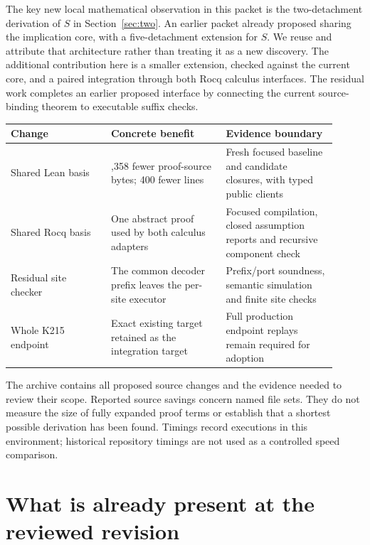 \documentclass[11pt,letterpaper]{article}
\begin{document}
The key new local mathematical observation in this packet is the two-detachment
derivation of $S$ in Section~\ref{sec:two}. An earlier packet already proposed
sharing the implication core, with a five-detachment extension for $S$.
We reuse and attribute that architecture rather than treating it as a new
discovery. The additional contribution here is a smaller extension, checked
against the current core, and a paired integration through both Rocq calculus
interfaces. The residual work completes an earlier proposed interface by
connecting the current source-binding theorem to executable suffix checks.

\begin{center}
\begin{tabular}{@{}>{\raggedright\arraybackslash}p{0.28\linewidth}>{\raggedright\arraybackslash}p{0.32\linewidth}>{\raggedright\arraybackslash}p{0.31\linewidth}@{}}
\toprule
Change & Concrete benefit & Evidence boundary \\
\midrule
Shared Lean basis & 24,358 fewer proof-source bytes; 400 fewer lines & Fresh focused baseline and candidate closures, with typed public clients \\
Shared Rocq basis & One abstract proof used by both calculus adapters & Focused compilation, closed assumption reports and recursive component check \\
Residual site checker & The common decoder prefix leaves the per-site executor & Prefix/port soundness, semantic simulation and finite site checks \\
Whole K215 endpoint & Exact existing target retained as the integration target & Full production endpoint replays remain required for adoption \\
\bottomrule
\end{tabular}
\end{center}

The archive contains all proposed source changes and the evidence needed to
review their scope. Reported source savings concern named file sets. They do not
measure the size of fully expanded proof terms or establish that a shortest
possible derivation has been found. Timings record executions in this environment;
historical repository timings are not used as a controlled speed comparison.

\section{What is already present at the reviewed revision}
\end{document}
